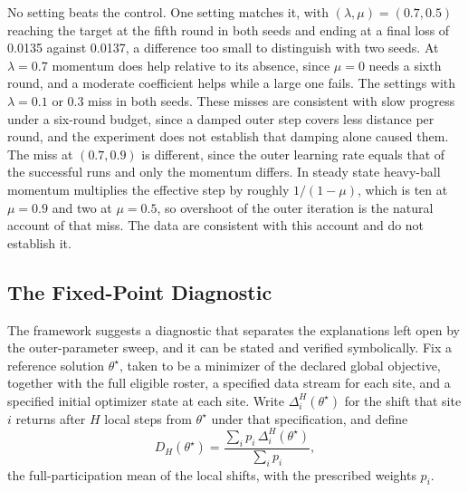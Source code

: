 \documentclass[11pt]{article}
\theoremstyle{definition}
\theoremstyle{remark}
\begin{document}
No setting beats the control. One setting matches it, with $(\lambda,\mu)=(0.7,0.5)$ reaching the target at the fifth round in both seeds and ending at a final loss of 0.0135 against 0.0137, a difference too small to distinguish with two seeds. At $\lambda=0.7$ momentum does help relative to its absence, since $\mu=0$ needs a sixth round, and a moderate coefficient helps while a large one fails. The settings with $\lambda=0.1$ or $0.3$ miss in both seeds. These misses are consistent with slow progress under a six-round budget, since a damped outer step covers less distance per round, and the experiment does not establish that damping alone caused them. The miss at $(0.7,0.9)$ is different, since the outer learning rate equals that of the successful runs and only the momentum differs. In steady state heavy-ball momentum multiplies the effective step by roughly $1/(1-\mu)$, which is ten at $\mu=0.9$ and two at $\mu=0.5$, so overshoot of the outer iteration is the natural account of that miss. The data are consistent with this account and do not establish it.

\subsection{The Fixed-Point Diagnostic}

The framework suggests a diagnostic that separates the explanations left open by the outer-parameter sweep, and it can be stated and verified symbolically. Fix a reference solution $\theta^\star$, taken to be a minimizer of the declared global objective, together with the full eligible roster, a specified data stream for each site, and a specified initial optimizer state at each site. Write $\Delta_i^H(\theta^\star)$ for the shift that site $i$ returns after $H$ local steps from $\theta^\star$ under that specification, and define
\[
D_H(\theta^\star)=\frac{\sum_i p_i\,\Delta_i^H(\theta^\star)}{\sum_i p_i},
\]
the full-participation mean of the local shifts, with the prescribed weights $p_i$.
\end{document}
